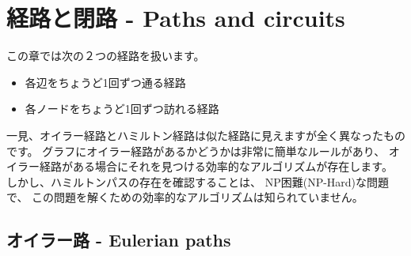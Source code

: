 \chapter{経路と閉路 - Paths and circuits}

この章では次の２つの経路を扱います。
\begin{itemize}
\item {} 各辺をちょうど1回ずつ通る経路
\item {} 各ノードをちょうど1回ずつ訪れる経路
\end{itemize}

一見、オイラー経路とハミルトン経路は似た経路に見えますが全く異なったものです。
グラフにオイラー経路があるかどうかは非常に簡単なルールがあり、
オイラー経路がある場合にそれを見つける効率的なアルゴリズムが存在します。
しかし、ハミルトンパスの存在を確認することは、 NP困難(NP-Hard)な問題で、
この問題を解くための効率的なアルゴリズムは知られていません。

\section{オイラー路 - Eulerian paths}


